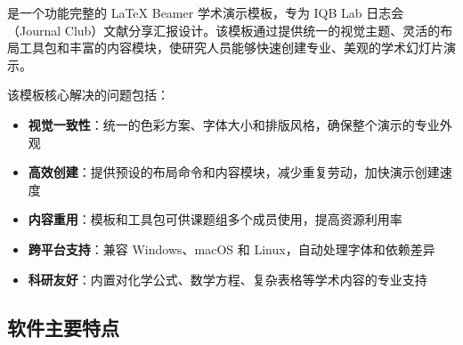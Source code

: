 \Name 是一个功能完整的 LaTeX Beamer 学术演示模板，专为 IQB Lab 日志会（Journal Club）文献分享汇报设计。该模板通过提供统一的视觉主题、灵活的布局工具包和丰富的内容模块，使研究人员能够快速创建专业、美观的学术幻灯片演示。

该模板核心解决的问题包括：

\begin{itemize}
    \item \textbf{视觉一致性}：统一的色彩方案、字体大小和排版风格，确保整个演示的专业外观
    \item \textbf{高效创建}：提供预设的布局命令和内容模块，减少重复劳动，加快演示创建速度
    \item \textbf{内容重用}：模板和工具包可供课题组多个成员使用，提高资源利用率
    \item \textbf{跨平台支持}：兼容 Windows、macOS 和 Linux，自动处理字体和依赖差异
    \item \textbf{科研友好}：内置对化学公式、数学方程、复杂表格等学术内容的专业支持
\end{itemize}

\subsection{软件主要特点}

